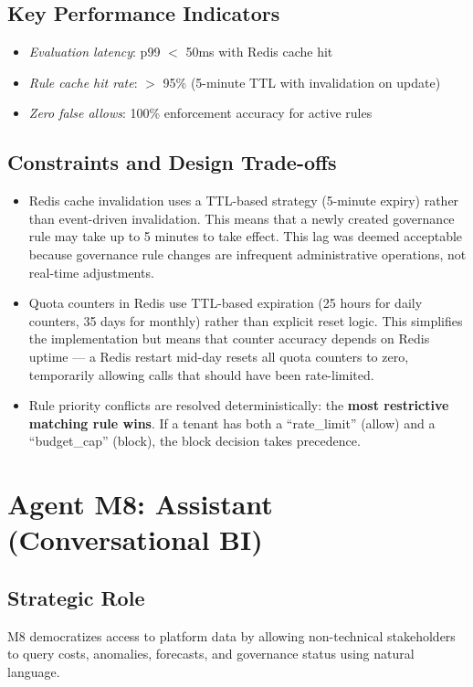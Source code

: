 \documentclass[12pt,a4paper,twoside]{report}
\newcommand{\kpi}[1]{\textit{\textcolor{accentgreen}{#1}}}
\begin{document}
\subsection{Key Performance Indicators}
\begin{itemize}
  \item \kpi{Evaluation latency}: p99 $<$ 50ms with Redis cache hit
  \item \kpi{Rule cache hit rate}: $>$ 95\% (5-minute TTL with invalidation on update)
  \item \kpi{Zero false allows}: 100\% enforcement accuracy for active rules
\end{itemize}

\subsection{Constraints and Design Trade-offs}
\begin{itemize}
  \item Redis cache invalidation uses a TTL-based strategy (5-minute expiry) rather than event-driven invalidation. This means that a newly created governance rule may take up to 5 minutes to take effect. This lag was deemed acceptable because governance rule changes are infrequent administrative operations, not real-time adjustments.
  \item Quota counters in Redis use TTL-based expiration (25 hours for daily counters, 35 days for monthly) rather than explicit reset logic. This simplifies the implementation but means that counter accuracy depends on Redis uptime — a Redis restart mid-day resets all quota counters to zero, temporarily allowing calls that should have been rate-limited.
  \item Rule priority conflicts are resolved deterministically: the \textbf{most restrictive matching rule wins}. If a tenant has both a ``rate\_limit'' (allow) and a ``budget\_cap'' (block), the block decision takes precedence.
\end{itemize}

\section{Agent M8: Assistant (Conversational BI)}

\subsection{Strategic Role}
M8 democratizes access to platform data by allowing non-technical stakeholders to query costs, anomalies, forecasts, and governance status using natural language.
\end{document}
